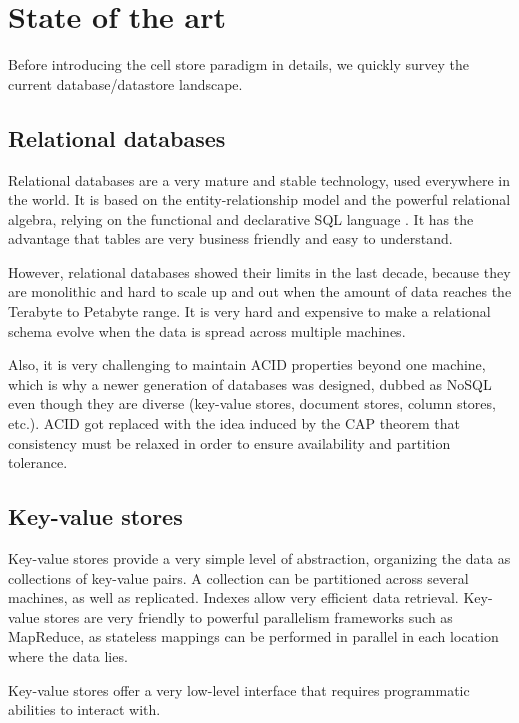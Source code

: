 \documentclass{acm_proc_article-sp}
\begin{document}
\section{State of the art}
Before introducing the cell store paradigm in details, we quickly survey the current database/datastore landscape.

\label{section-state-of-the-art}

\subsection{Relational databases}

Relational databases are a very mature and stable technology, used everywhere in the world. It is based on the entity-relationship model and the powerful relational algebra, relying on the functional and declarative SQL language \cite{Chamberlin1974}. It has the advantage that tables are very business friendly and easy to understand.

However, relational databases showed their limits in the last decade, because they are monolithic and hard to scale up and out when the amount of data reaches the Terabyte to Petabyte range. It is very hard and expensive to make a relational schema evolve when the data is spread across multiple machines.

Also, it is very challenging to maintain ACID properties \cite{Haerder1983} beyond one machine, which is why a newer generation of databases was designed, dubbed as NoSQL even though they are diverse (key-value stores, document stores, column stores, etc.). ACID got replaced with the idea induced by the CAP theorem \cite{Gilbert2002} that consistency must be relaxed in order to ensure availability and partition tolerance.

\subsection{Key-value stores}

Key-value stores provide a very simple level of abstraction, organizing the data as collections of key-value pairs. A collection can be partitioned across several machines, as well as replicated. Indexes allow very efficient data retrieval. Key-value stores are very friendly to powerful parallelism frameworks such as MapReduce, as stateless mappings can be performed in parallel in each location where the data lies.

Key-value stores offer a very low-level interface that requires programmatic abilities to interact with.
\end{document}
